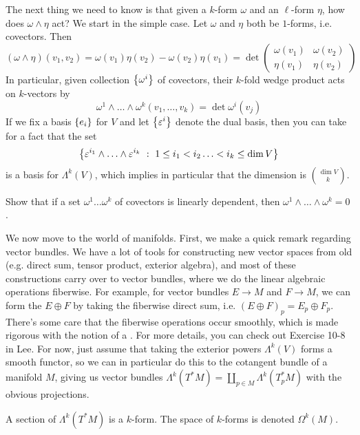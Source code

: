 The next thing we need to know is that given a $k$-form $\omega$ and
an $\ell$-form $\eta$, how does $\omega \wedge \eta$ act? We start in the simple
case. Let $\omega$ and $\eta$ both be $1$-forms, i.e. covectors. Then
$$(\omega \wedge \eta)(v_1,v_2) = \omega(v_1)\eta(v_2) - \omega(v_2)\eta(v_1)
= \det\begin{pmatrix}
  \omega(v_1) & \omega(v_2) \\
  \eta(v_1) & \eta(v_2)
\end{pmatrix}$$
In particular, given collection $\left\lbrace \omega^i \right\rbrace$ of covectors, their $k$-fold
wedge product acts on $k$-vectors by
$$\omega^1 \wedge \ldots \wedge \omega^k(v_1, \ldots ,v_k) = \det \omega^i(v_j)$$
If we fix a basis $\left\lbrace e_i \right\rbrace$ for $V$ and let $\left\lbrace \varepsilon^i \right\rbrace$ denote the
dual basis, then you can take for a fact that the set
$$\left\lbrace \varepsilon^{i_1} \wedge \ldots \wedge \varepsilon^{i_k}~:~
1 \leq i_1 < i_2 \ldots < i_k \leq \dim V \right\rbrace $$
is a basis for $\Lambda^k(V)$, which implies in particular that the dimension is
$\binom{\dim V}{k}$.
%
\begin{exer}
Show that if a set $\omega^1 \ldots \omega^k$ of covectors is linearly dependent,
then $\omega^1 \wedge \ldots \wedge \omega^k = 0$.
\end{exer}
%
We now move to the world of manifolds. First, we make a quick remark regarding
vector bundles. We have a lot of tools for constructing new vector spaces from
old (e.g. direct sum, tensor product, exterior algebra), and most of these
constructions carry over to vector bundles, where we do the linear algebraic
operations fiberwise. For example, for vector bundles $E \to M$ and $F \to M$,
we can form the  $E \oplus F$ by taking the fiberwise direct sum,
i.e. $(E \oplus F)_p = E_p \oplus F_p$. There's some care that the fiberwise
operations occur smoothly, which is made rigorous with the notion of a
. For more details, you can check out Exercise 10-8 in Lee.
For now, just assume that taking the exterior powers $\Lambda^k(V)$ forms
a smooth functor, so we can in particular do this to the cotangent bundle
of a manifold $M$, giving us vector bundles
$\Lambda^k(T^*M) = \coprod_{p \in M} \Lambda^k(T^*_pM)$ with the obvious
projections.
%
\begin{defn}
A section of $\Lambda^k(T^*M)$ is a  $k$-form. The space
of $k$-forms is denoted $\Omega^k(M)$.
\end{defn}
%
